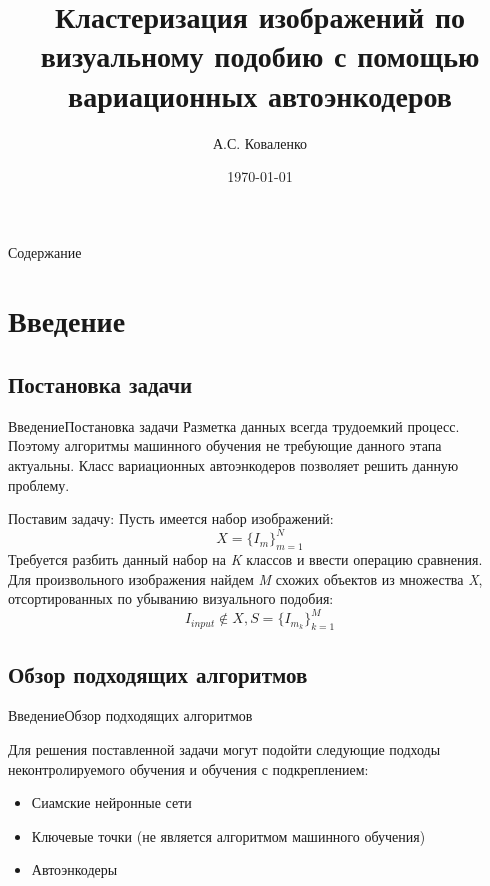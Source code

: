 \documentclass{beamer}
\title[Неконтролируемое обучение]{Кластеризация изображений по визуальному подобию с помощью вариационных автоэнкодеров}
\author{А.С. Коваленко}
\institute{ЮФУ}
\date{\today}
\begin{document}
\begin{frame}
  \titlepage
\end{frame}

\begin{frame}{Содержание}
  \tableofcontents
\end{frame}

\section{Введение}

\subsection{Постановка задачи}
\begin{frame}{Введение}{Постановка задачи}
Разметка данных всегда трудоемкий процесс. Поэтому алгоритмы машинного обучения не требующие данного этапа актуальны. Класс вариационных автоэнкодеров позволяет решить данную проблему.\\

\begin{block}{Поставим задачу:}
	Пусть имеется набор изображений:
	\begin{equation}\label{eq:X}
		X = \{I_m\}_{m = 1}^{N}
	\end{equation}
	Требуется разбить данный набор на \textit{K} классов и ввести операцию сравнения.\\
	Для произвольного изображения найдем \textit{M} схожих объектов из множества \textit{X}, отсортированных по убыванию визуального подобия:
	$$I_{input} \notin X,  S = \{I_{m_k}\}_{k=1}^M$$
\end{block}

\end{frame}

\subsection{Обзор подходящих алгоритмов}



\begin{frame}{Введение}{Обзор подходящих алгоритмов}

Для решения поставленной задачи могут подойти следующие подходы неконтролируемого обучения и обучения с подкреплением:
\begin{itemize}
	\item Сиамские нейронные сети
	\item Ключевые точки (не является алгоритмом машинного обучения)
	\item Автоэнкодеры
\end{itemize}

\end{frame}
\end{document}
